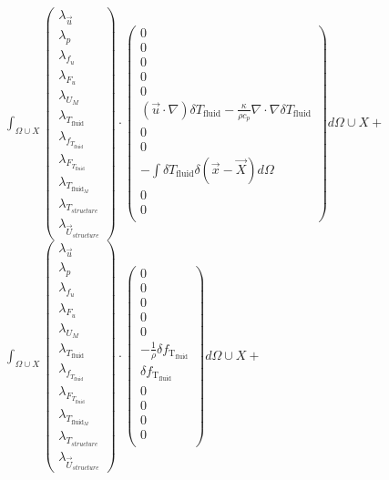 \documentclass[10pt]{article} %
\begin{document}
\begin{center}
	$\int_{\Omega \cup X}
	\begin{pmatrix}
		\lambda_{\vec{u}} \\ \lambda_p \\ \lambda_{f_u} \\ \lambda_{F_u} \\ \lambda_{U_M}\\ \lambda_{T_{\text{fluid}}} \\ \lambda_{f_{T_{\text{fluid}}}} \\ \lambda_{F_{T_{\text{fluid}}}} \\ \lambda_{T_{\text{fluid}_M}} \\ \lambda_{T_{structure}} \\ \lambda_{\vec{U}_{structure}}
	\end{pmatrix}
	\cdot
	\begin{pmatrix}
		0 \\
		0\\
		0 \\
		0 \\
		0 \\
		(\vec{u} \cdot \nabla) \delta T_{\text{fluid}} - \frac{\kappa}{\rho c_p} \nabla \cdot \nabla \delta T_{\text{fluid}} \\
		0\\
		0\\
		-\int \delta T_{\text{fluid}} \delta (\vec{x}-\vec{X}) d\Omega\\
		0\\
		0\\
	\end{pmatrix}
	d\Omega \cup X + $\\

	$\int_{\Omega \cup X}
	\begin{pmatrix}
		\lambda_{\vec{u}} \\ \lambda_p \\ \lambda_{f_u} \\ \lambda_{F_u} \\ \lambda_{U_M}\\ \lambda_{T_{\text{fluid}}} \\ \lambda_{f_{T_{\text{fluid}}}} \\ \lambda_{F_{T_{\text{fluid}}}} \\ \lambda_{T_{\text{fluid}_M}} \\ \lambda_{T_{structure}} \\ \lambda_{\vec{U}_{structure}}
	\end{pmatrix}
	\cdot
	\begin{pmatrix}
		0 \\
		0\\
		0 \\
		0 \\
		0 \\
		-\frac{1}{\rho}\delta f_{\text{T}_{\text{fluid}}} \\
		\delta f_{\text{T}_{\text{fluid}}}\\
		0\\
		0\\
		0\\
		0\\
	\end{pmatrix}
	d\Omega \cup X + $\\


\end{center}
\end{document}
